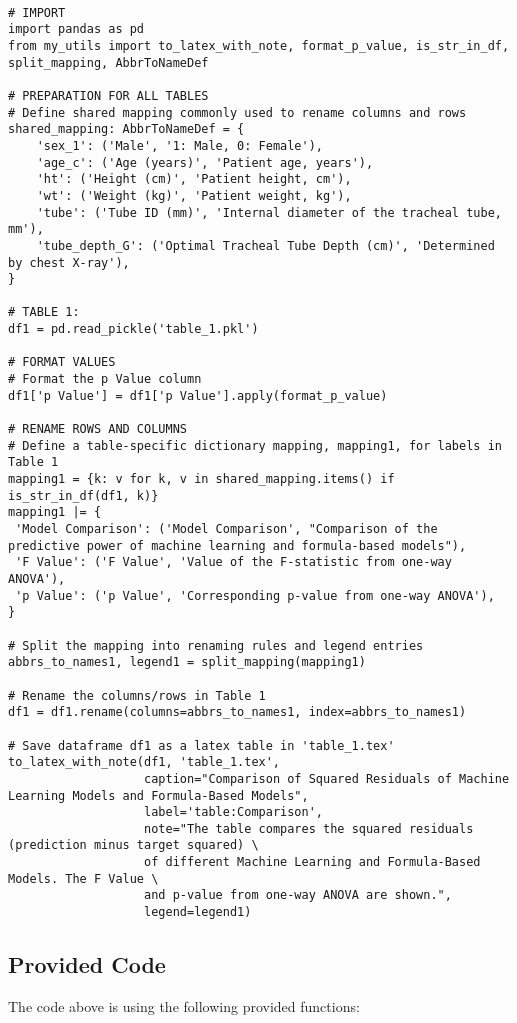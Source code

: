 \documentclass[11pt]{article}
\begin{document}
\begin{verbatim}

# IMPORT
import pandas as pd
from my_utils import to_latex_with_note, format_p_value, is_str_in_df, split_mapping, AbbrToNameDef

# PREPARATION FOR ALL TABLES
# Define shared mapping commonly used to rename columns and rows
shared_mapping: AbbrToNameDef = {
    'sex_1': ('Male', '1: Male, 0: Female'),
    'age_c': ('Age (years)', 'Patient age, years'),
    'ht': ('Height (cm)', 'Patient height, cm'),
    'wt': ('Weight (kg)', 'Patient weight, kg'),
    'tube': ('Tube ID (mm)', 'Internal diameter of the tracheal tube, mm'),
    'tube_depth_G': ('Optimal Tracheal Tube Depth (cm)', 'Determined by chest X-ray'),
}

# TABLE 1:
df1 = pd.read_pickle('table_1.pkl')

# FORMAT VALUES
# Format the p Value column
df1['p Value'] = df1['p Value'].apply(format_p_value)

# RENAME ROWS AND COLUMNS
# Define a table-specific dictionary mapping, mapping1, for labels in Table 1
mapping1 = {k: v for k, v in shared_mapping.items() if is_str_in_df(df1, k)} 
mapping1 |= {
 'Model Comparison': ('Model Comparison', "Comparison of the predictive power of machine learning and formula-based models"),
 'F Value': ('F Value', 'Value of the F-statistic from one-way ANOVA'),
 'p Value': ('p Value', 'Corresponding p-value from one-way ANOVA'),
}

# Split the mapping into renaming rules and legend entries
abbrs_to_names1, legend1 = split_mapping(mapping1)

# Rename the columns/rows in Table 1
df1 = df1.rename(columns=abbrs_to_names1, index=abbrs_to_names1)

# Save dataframe df1 as a latex table in 'table_1.tex'
to_latex_with_note(df1, 'table_1.tex',
                   caption="Comparison of Squared Residuals of Machine Learning Models and Formula-Based Models",
                   label='table:Comparison',
                   note="The table compares the squared residuals (prediction minus target squared) \
                   of different Machine Learning and Formula-Based Models. The F Value \
                   and p-value from one-way ANOVA are shown.",
                   legend=legend1)

\end{verbatim}

\subsection{Provided Code}
The code above is using the following provided functions:
\end{document}
